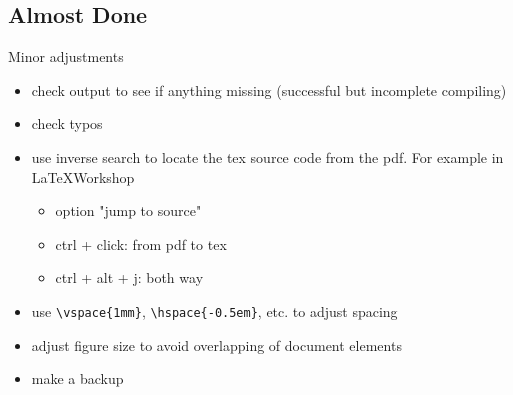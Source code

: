\documentclass [xcolor=svgnames, t] {beamer}
\begin{document}
\subsection{Almost Done}
\begin{frame}[fragile]{Minor adjustments}
    \begin{itemize}
        \item check output to see if anything missing (successful but incomplete compiling)
        \item check typos
        \item use inverse search to locate the tex source code from the pdf. For example in LaTeXWorkshop
        \begin{itemize}
            \item option "jump to source"
            \item ctrl + click: from pdf to tex
            \item ctrl + alt + j: both way
        \end{itemize}
        \item use \verb|\vspace{1mm}|, \verb|\hspace{-0.5em}|, etc. to adjust spacing
        \item adjust figure size to avoid overlapping of document elements
        \item make a backup
    \end{itemize}
\end{frame}
\end{document}
